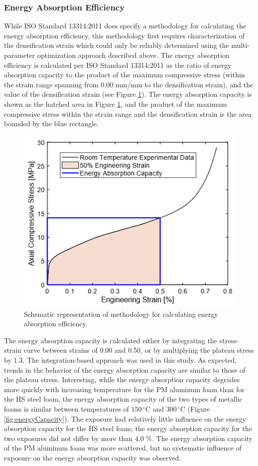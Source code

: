 \documentclass[review]{elsarticle}
\begin{document}
{\subsubsection{Energy Absorption Efficiency}

While ISO Standard 13314:2011 does specify a methodology for calculating the energy absorption efficiency, this methodology first requires characterization of the densification strain which could only be reliably determined using the multi-parameter optimization approach described above. The energy absorption efficiency is calculated per ISO Standard 13314:2011 as the ratio of energy absorption capacity to the product of the maximum compressive stress (within the strain range spanning from 0.00 mm/mm to the densification strain), and the value of the densification strain (see Figure \ref{EnAbsEffExpl}). The energy absorption capacity is shown as the hatched area in Figure \ref{EnAbsEffExpl}, and the product of the maximum compressive stress within the strain range and the densification strain is the area bounded by the blue rectangle.

\begin{figure}[htbp]
	\begin{center}
		\includegraphics[width=0.60\linewidth]
		{Tex-Figures/Fig20-energyAbsorptionEfficiency.png}
		\vspace{-0.2cm}
		\caption{Schematic representation of methodology for calculating energy absorption efficiency.}
		\label{EnAbsEffExpl}
	\end{center}
\end{figure}

The energy absorption capacity is calculated either by integrating the stress-strain curve between strains of 0.00 and 0.50, or by multiplying the plateau stress by 1.3. The integration-based approach was used in this study. As expected, trends in the behavior of the energy absorption capacity are similar to those of the plateau stress. Interesting, while the energy absorption capacity degrades more quickly with increasing temperature for the PM aluminum foam than for the HS steel foam, the energy absorption capacity of the two types of metallic foams is similar between temperatures of $150\,^{\circ}\mathrm{C}$ and $300\,^{\circ}\mathrm{C}$ (Figure \ref{fig:energyCapacity}). The exposure had relatively little influence on the energy absorption capacity for the HS steel foam; the energy absorption capacity for the two exposures did not differ by more than 4.0 \%. The energy absorption capacity of the PM aluminum foam was more scattered, but no systematic influence of exposure on the energy absorption capacity was observed.

}
\end{document}
